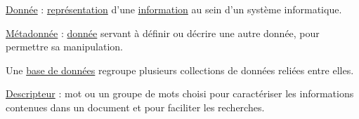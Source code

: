 
\begin{jazzitemize}
\item \href{https://fr.wikipedia.org/wiki/Donn\%C3\%A9e_(informatique)}{Donnée} : \href{https://fr.wikipedia.org/wiki/Repr\%C3\%A9sentation}{représentation} d'une \href{}{information} au sein d'un système informatique.
\item \href{https://fr.wikipedia.org/wiki/M\%C3\%A9tadonn\%C3\%A9e}{Métadonnée} : \href{https://fr.wikipedia.org/wiki/Donn\%C3\%A9e_(informatique)}{donnée} servant à définir ou décrire une autre donnée, pour permettre sa manipulation.
\item Une \href{https://fr.wikipedia.org/wiki/Base_de_donn\%C3\%A9es}{base de données} regroupe plusieurs collections de données reliées entre elles.
\item \href{https://fr.wiktionary.org/wiki/descripteur}{Descripteur} : mot ou un groupe de mots choisi pour caractériser les informations contenues dans un document et pour faciliter les recherches.
\end{jazzitemize}


